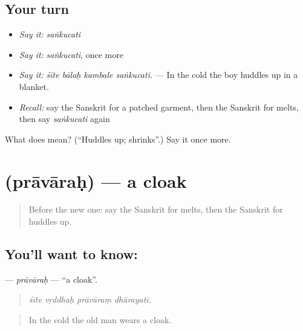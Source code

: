 \subsection*{Your turn}
\begin{itemize}
\raggedright
  \item \emph{Say it:} \emph{saṅkucati}
  \item \emph{Say it:} \emph{saṅkucati}, once more
  \item \emph{Say it:} \emph{śīte bālaḥ kambale saṅkucati.} — In the cold the boy huddles up in a blanket.
  \item \emph{Recall:} say the Sanskrit for a patched garment, then the Sanskrit for melts, then say \emph{saṅkucati} again
\end{itemize}

\begin{tcolorbox}[breakable,colback=teal!4,colframe=teal!35!black,title={Before you move on}]
What does  mean? (\textquotedblleft{}Huddles up; shrinks\textquotedblright{}.) Say it once more.
\end{tcolorbox}
\section[\texorpdfstring{\sk{प्रावारः} (prāvāraḥ)}{प्रावारः (prāvāraḥ)}]{ (prāvāraḥ) — a cloak}

\label{lesson:SA-C440-pravarah}



\begin{quote}
Before the new one: say the Sanskrit for melts, then the Sanskrit for huddles up.
\end{quote}

\subsection*{You'll want to know: }
\textbf{} — \emph{prāvāraḥ} — \textquotedblleft{}a cloak\textquotedblright{}.

\begin{quote}
   
\end{quote}

\begin{quote}
\emph{śīte vṛddhaḥ prāvāraṃ dhārayati.}
\end{quote}

\begin{quote}
In the cold the old man wears a cloak.
\end{quote}

